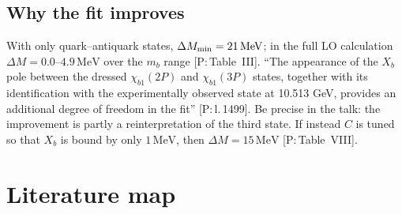 \documentclass[11pt,a4paper]{article}
\newcommand{\tagP}[1]{\textcolor{blue!65!black}{\textsf{\small[P:\,#1]}}}
\newcommand{\MeV}{\,\mathrm{MeV}}
\begin{document}
\subsection{Why the fit improves}
With only quark--antiquark states, $\Delta M_{\rm min}=21\MeV$; in the full LO calculation $\Delta M=0.0$--$4.9\MeV$ over the $m_b$ range \tagP{Table~III}. ``The appearance of the $X_b$ pole between the dressed $\chi_{b1}(2P)$ and $\chi_{b1}(3P)$ states, together with its identification with the experimentally observed state at 10.513 GeV, provides an additional degree of freedom in the fit'' \tagP{l.\,1499}. Be precise in the talk: the improvement is partly a reinterpretation of the third state. If instead $C$ is tuned so that $X_b$ is bound by only $1\MeV$, then $\Delta M=15\MeV$ \tagP{Table~VIII}.

\section{Literature map}
\label{sec:lit}
\end{document}
